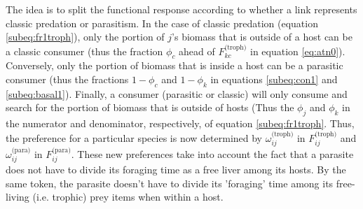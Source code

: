 \documentclass[11pt]{amsart}
\begin{document}
The idea is to split the functional response according to whether a link represents classic predation or parasitism.  In the case of classic predation (equation \eqref{subeq:fr1troph}), only the portion of $j$'s biomass that is outside of a host can be a classic consumer (thus the fraction $\phi_c$ ahead of $F_{kc}^\text{(troph)}$ in equation \eqref{eq:atn0}).  Conversely, only the portion of biomass that is inside a host can be a parasitic consumer (thus the fractions $1-\phi_c$ and $1-\phi_k$ in equations \eqref{subeq:con1} and \eqref{subeq:basal1}).  Finally, a consumer (parasitic or classic) will only consume and search for the portion of biomass that is outside of hosts (Thus the $\phi_j$ and $\phi_k$ in the numerator and denominator, respectively, of equation \eqref{subeq:fr1troph}.  Thus, the preference for a particular species is now determined by $\omega_{ij}^\text{(troph)}$ in $F_{ij}^\text{(troph)}$ and $\omega_{ij}^\text{(para)}$ in $F_{ij}^\text{(para)}$.  These new preferences take into account the fact that a parasite does not have to divide its foraging time as a free liver among its hosts.  By the same token, the parasite doesn't have to divide its 'foraging' time among its free-living (i.e. trophic) prey items when within a host.
\end{document}
